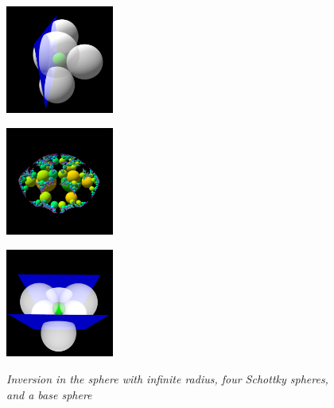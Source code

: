 \begin{figure}[h!tbp]
 \begin{minipage}[t]{0.5\hsize}
  \begin{minipage}{0.25\hsize}
   \center
   \includegraphics[width=1.4in, height=1.4in, keepaspectratio]{./img/application/3dGen/infSphereGen.pdf}
   \label{fig:infSphereGen}
  \end{minipage}
  \hspace*{\fill}
  \begin{minipage}{0.25\hsize}
   \center
   \includegraphics[width=1.4in, height=1.4in, keepaspectratio]{./img/application/3dGen/infSphereOrbit.pdf}
   \label{fig:infSphereOrb}
  \end{minipage}
  \hspace*{\fill}
  \caption{\textit{Inversion in the sphere with infinite radius, four
  Schottky spheres, and a base sphere}}
  \label{fig:infSphere}
 \end{minipage}
 \hspace*{\fill}
 \begin{minipage}[t]{0.5\hsize}
  \begin{minipage}{0.25\hsize}
   \center
   \includegraphics[width=1.4in, height=1.4in, keepaspectratio]{./img/application/3dGen/translationGen.pdf}
   \label{fig:translation3dGen}
  \end{minipage}

\end{minipage}
\end{figure}
